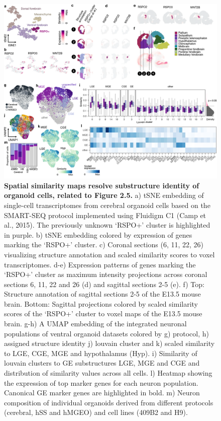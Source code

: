 \begin{figure}[h!]
    \centering
	\includegraphics[width=\textwidth]{figures/voxhunt/Supp_6}
    \caption{\textbf{Spatial similarity maps resolve substructure identity of organoid cells, related to Figure 2.5.} a) tSNE embedding of single-cell transcriptomes from cerebral organoid cells based on the SMART-SEQ protocol implemented using Fluidigm C1 (Camp et al., 2015).  The previously unknown ‘RSPO+’ cluster is highlighted in purple. b) tSNE embedding colored by expression of genes marking the ‘RSPO+’ cluster. c) Coronal sections (6, 11, 22, 26) visualizing structure annotation and scaled similarity scores to voxel transcriptomes. d-e) Expression patterns of genes marking the ‘RSPO+’ cluster as maximum intensity projections across coronal sections 6, 11, 22 and 26 (d) and sagittal sections 2-5 (e). f) Top: Structure annotation of sagittal sections 2-5 of the E13.5 mouse brain. Bottom: Sagittal projections colored by scaled similarity scores of the ‘RSPO+’ cluster to voxel maps of the E13.5 mouse brain. g-h) A UMAP embedding of the integrated neuronal populations of ventral organoid datasets colored by g) protocol, h) assigned structure identity j) louvain cluster and k) scaled similarity to LGE, CGE, MGE and hypothalamus (Hyp). i) Similarity of louvain clusters to GE substructures LGE, MGE and CGE and distribution of similarity values across all cells. l) Heatmap showing the expression of top marker genes for each neuron population. Canonical GE marker genes are highlighted in bold. m) Neuron composition of individual organoids derived from different protocols (cerebral, hSS and hMGEO) and cell lines (409B2 and H9).}
    \label{fig:voxS6}
\end{figure}

